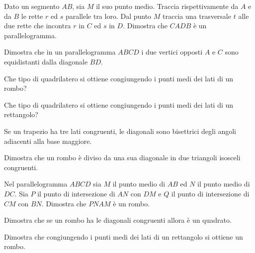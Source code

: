 \begin{multicols}{2}
\begin{esercizio}
	\label{ese:4.18}
	Dato un segmento $AB$, sia $M$ il suo punto medio. Traccia 
	rispettivamente da $A$ e da $B$ le rette $r$ ed $s$ parallele tra 
	loro. Dal punto $M$ traccia una trasversale $t$ alle due rette che 
	incontra $r$ in $C$ ed $s$ in $D$. Dimostra che $CADB$ è un 
	parallelogramma.
\end{esercizio}

\begin{esercizio}
	\label{ese:4.19}
	Dimostra che in un parallelogramma $ABCD$ i due vertici opposti $A$ e 
	$C$ sono equidistanti dalla diagonale $BD$.
\end{esercizio}

\begin{esercizio}
	\label{ese:4.50}
	Che tipo di quadrilatero si ottiene congiungendo i punti medi dei 
	lati di un rombo?
\end{esercizio}

\begin{esercizio}
	\label{ese:4.51}
	Che tipo di quadrilatero si ottiene congiungendo i punti medi dei 
	lati di un rettangolo?
\end{esercizio}

\begin{esercizio}
\label{ese:4.8}
Se un trapezio ha tre lati congruenti, le diagonali sono bisettrici 
degli angoli adiacenti alla base maggiore.
\end{esercizio}

\begin{esercizio}
\label{ese:4.9}
Dimostra che un rombo è diviso da una sua diagonale in due triangoli 
isosceli congruenti.
\end{esercizio}

\begin{esercizio}
\label{ese:4.21}
Nel parallelogramma $ABCD$ sia $M$ il punto medio di $AB$ ed $N$ il 
punto medio di $DC$. Sia $P$ il punto di intersezione di $AN$ con 
$DM$ e $Q$ il punto di intersezione di $CM$ con $BN$. Dimostra che 
$PNAM$ è un rombo.
\end{esercizio}

\begin{esercizio}
\label{ese:4.22}
Dimostra che se un rombo ha le diagonali congruenti allora è un 
quadrato.
\end{esercizio}

\begin{esercizio}
\label{ese:4.23}
Dimostra che congiungendo i punti medi dei lati di un rettangolo si 
ottiene un rombo.
\end{esercizio}


\end{multicols}
